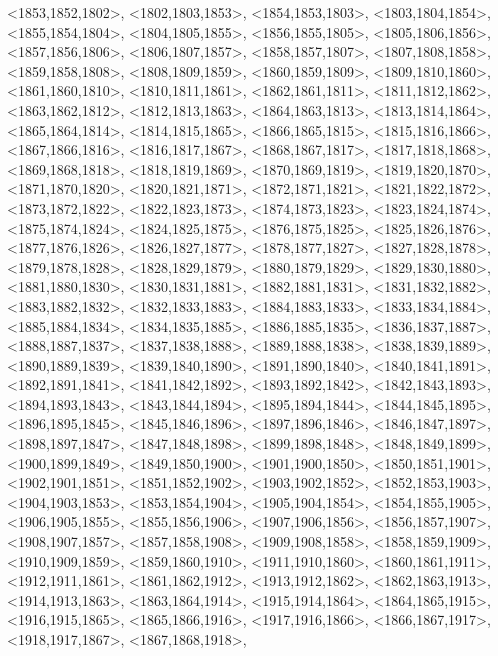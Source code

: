 \documentclass[a4paper,10pt]{article}
\begin{document}
\begin{eulernotebook}
\begin{euleroutput}
  <1853,1852,1802>,
  <1802,1803,1853>,
  <1854,1853,1803>,
  <1803,1804,1854>,
  <1855,1854,1804>,
  <1804,1805,1855>,
  <1856,1855,1805>,
  <1805,1806,1856>,
  <1857,1856,1806>,
  <1806,1807,1857>,
  <1858,1857,1807>,
  <1807,1808,1858>,
  <1859,1858,1808>,
  <1808,1809,1859>,
  <1860,1859,1809>,
  <1809,1810,1860>,
  <1861,1860,1810>,
  <1810,1811,1861>,
  <1862,1861,1811>,
  <1811,1812,1862>,
  <1863,1862,1812>,
  <1812,1813,1863>,
  <1864,1863,1813>,
  <1813,1814,1864>,
  <1865,1864,1814>,
  <1814,1815,1865>,
  <1866,1865,1815>,
  <1815,1816,1866>,
  <1867,1866,1816>,
  <1816,1817,1867>,
  <1868,1867,1817>,
  <1817,1818,1868>,
  <1869,1868,1818>,
  <1818,1819,1869>,
  <1870,1869,1819>,
  <1819,1820,1870>,
  <1871,1870,1820>,
  <1820,1821,1871>,
  <1872,1871,1821>,
  <1821,1822,1872>,
  <1873,1872,1822>,
  <1822,1823,1873>,
  <1874,1873,1823>,
  <1823,1824,1874>,
  <1875,1874,1824>,
  <1824,1825,1875>,
  <1876,1875,1825>,
  <1825,1826,1876>,
  <1877,1876,1826>,
  <1826,1827,1877>,
  <1878,1877,1827>,
  <1827,1828,1878>,
  <1879,1878,1828>,
  <1828,1829,1879>,
  <1880,1879,1829>,
  <1829,1830,1880>,
  <1881,1880,1830>,
  <1830,1831,1881>,
  <1882,1881,1831>,
  <1831,1832,1882>,
  <1883,1882,1832>,
  <1832,1833,1883>,
  <1884,1883,1833>,
  <1833,1834,1884>,
  <1885,1884,1834>,
  <1834,1835,1885>,
  <1886,1885,1835>,
  <1836,1837,1887>,
  <1888,1887,1837>,
  <1837,1838,1888>,
  <1889,1888,1838>,
  <1838,1839,1889>,
  <1890,1889,1839>,
  <1839,1840,1890>,
  <1891,1890,1840>,
  <1840,1841,1891>,
  <1892,1891,1841>,
  <1841,1842,1892>,
  <1893,1892,1842>,
  <1842,1843,1893>,
  <1894,1893,1843>,
  <1843,1844,1894>,
  <1895,1894,1844>,
  <1844,1845,1895>,
  <1896,1895,1845>,
  <1845,1846,1896>,
  <1897,1896,1846>,
  <1846,1847,1897>,
  <1898,1897,1847>,
  <1847,1848,1898>,
  <1899,1898,1848>,
  <1848,1849,1899>,
  <1900,1899,1849>,
  <1849,1850,1900>,
  <1901,1900,1850>,
  <1850,1851,1901>,
  <1902,1901,1851>,
  <1851,1852,1902>,
  <1903,1902,1852>,
  <1852,1853,1903>,
  <1904,1903,1853>,
  <1853,1854,1904>,
  <1905,1904,1854>,
  <1854,1855,1905>,
  <1906,1905,1855>,
  <1855,1856,1906>,
  <1907,1906,1856>,
  <1856,1857,1907>,
  <1908,1907,1857>,
  <1857,1858,1908>,
  <1909,1908,1858>,
  <1858,1859,1909>,
  <1910,1909,1859>,
  <1859,1860,1910>,
  <1911,1910,1860>,
  <1860,1861,1911>,
  <1912,1911,1861>,
  <1861,1862,1912>,
  <1913,1912,1862>,
  <1862,1863,1913>,
  <1914,1913,1863>,
  <1863,1864,1914>,
  <1915,1914,1864>,
  <1864,1865,1915>,
  <1916,1915,1865>,
  <1865,1866,1916>,
  <1917,1916,1866>,
  <1866,1867,1917>,
  <1918,1917,1867>,
  <1867,1868,1918>,

\end{euleroutput}
\end{eulernotebook}
\end{document}
